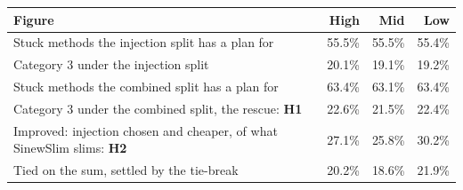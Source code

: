 \begin{tabular}{>{\raggedright\arraybackslash}p{8.4cm}rrr}
\toprule
Figure & High & Mid & Low \\
\midrule
Stuck methods the injection split has a plan for & 55.5\% & 55.5\% & 55.4\% \\
Category 3 under the injection split & 20.1\% & 19.1\% & 19.2\% \\
Stuck methods the combined split has a plan for & 63.4\% & 63.1\% & 63.4\% \\
Category 3 under the combined split, the rescue: \textbf{H1} & 22.6\% & 21.5\% & 22.4\% \\
Improved: injection chosen and cheaper, of what SinewSlim slims: \textbf{H2} & 27.1\% & 25.8\% & 30.2\% \\
Tied on the sum, settled by the tie-break & 20.2\% & 18.6\% & 21.9\% \\
\bottomrule
\end{tabular}

